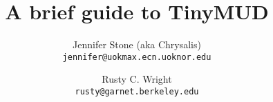 
\newcommand{\bs}{\char '134}	%
\newcommand{\ub}{\char '137}	%
\newcommand{\ua}{\char '136}	%
\newcommand{\qt}{\char '175}	%
\newcommand{\tl}{\char '176}	%
\newcommand{\sh}{\char '043}	%

\newcommand{\tinymud}{{\small Tiny}{MUD}}
\newcommand{\type}[1]{{\tt #1\/}}

\newenvironment{simple}{\begin{list}%
{\relax}%
{\setlength{\labelwidth}{0pt}%
 \setlength{\labelsep}{0pt}%
 \setlength{\leftmargin}{0pt}%
 \setlength{\listparindent}{0pt}}}%
{\end{list}}



\setlength{\rulewidth}{\textwidth}

\newcommand{\dorule}{\begin{center}
\rule{\rulewidth}{1pt}
\end{center}}

\makeindex

\title{{\bf A brief guide to {\large\bf Tiny}MUD}}

\author{Jennifer Stone (aka Chrysalis) \\
{\tt jennifer@uokmax.ecn.uoknor.edu}
\and
Rusty C. Wright \\
{\tt rusty@garnet.berkeley.edu}}




\ragright


\maketitle

\tableofcontents
\clearpage


